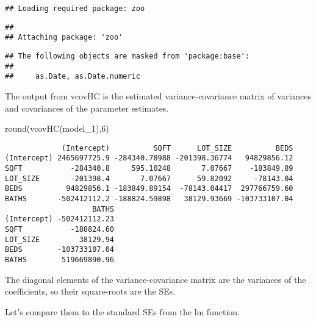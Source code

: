 \documentclass[
]{article}
\newenvironment{Shaded}{\begin{snugshade}}{\end{snugshade}}
\newcommand{\DecValTok}[1]{\textcolor[rgb]{0.00,0.00,0.81}{#1}}
\newcommand{\FunctionTok}[1]{\textcolor[rgb]{0.00,0.00,0.00}{#1}}
\newcommand{\NormalTok}[1]{#1}
\newcommand{\OtherTok}[1]{\textcolor[rgb]{0.56,0.35,0.01}{#1}}
\newcommand{\SpecialCharTok}[1]{\textcolor[rgb]{0.00,0.00,0.00}{#1}}
\begin{document}
\begin{verbatim}
## Loading required package: zoo
\end{verbatim}

\begin{verbatim}
## 
## Attaching package: 'zoo'
\end{verbatim}

\begin{verbatim}
## The following objects are masked from 'package:base':
## 
##     as.Date, as.Date.numeric
\end{verbatim}

The output from vcovHC is the estimated variance-covariance matrix of
variances and covariances of the parameter estimates.

\begin{Shaded}
\begin{Highlighting}[]
\FunctionTok{round}\NormalTok{(}\FunctionTok{vcovHC}\NormalTok{(model\_1),}\DecValTok{6}\NormalTok{)}
\end{Highlighting}
\end{Shaded}

\begin{verbatim}
             (Intercept)          SQFT      LOT_SIZE          BEDS
(Intercept) 2465697725.9 -284340.78988 -201398.36774   94829856.12
SQFT           -284340.8     595.10248       7.07667    -183849.89
LOT_SIZE       -201398.4       7.07667      59.82092     -78143.04
BEDS          94829856.1 -183849.89154  -78143.04417  297766759.60
BATHS       -502412112.2 -188824.59898   38129.93669 -103733107.04
                    BATHS
(Intercept) -502412112.23
SQFT           -188824.60
LOT_SIZE         38129.94
BEDS        -103733107.04
BATHS        519669890.96
\end{verbatim}

The diagonal elements of the variance-covariance matrix are the
variances of the coefficients, so their square-roots are the SEs.

Let's compare them to the standard SEs from the lm function.

\begin{Shaded}
\end{Shaded}
\end{document}
